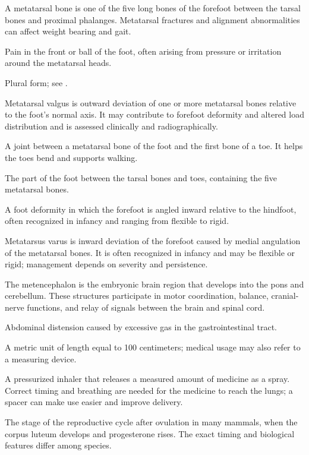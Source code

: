  A metatarsal bone is one of the five long bones of the forefoot between the tarsal bones and proximal phalanges. Metatarsal fractures and alignment abnormalities can affect weight bearing and gait.

 Pain in the front or ball of the foot, often arising from pressure or irritation around the metatarsal heads.

 Plural form; see .

 Metatarsal valgus is outward deviation of one or more metatarsal bones relative to the foot’s normal axis. It may contribute to forefoot deformity and altered load distribution and is assessed clinically and radiographically.

 A joint between a metatarsal bone of the foot and the first bone of a toe. It helps the toes bend and supports walking.

 The part of the foot between the tarsal bones and toes, containing the five metatarsal bones.

 A foot deformity in which the forefoot is angled inward relative to the hindfoot, often recognized in infancy and ranging from flexible to rigid.

 Metatarsus varus is inward deviation of the forefoot caused by medial angulation of the metatarsal bones. It is often recognized in infancy and may be flexible or rigid; management depends on severity and persistence.

 The metencephalon is the embryonic brain region that develops into the pons and cerebellum. These structures participate in motor coordination, balance, cranial-nerve functions, and relay of signals between the brain and spinal cord.

 Abdominal distension caused by excessive gas in the gastrointestinal tract.

 A metric unit of length equal to 100 centimeters; medical usage may also refer to a measuring device.

 A pressurized inhaler that releases a measured amount of medicine as a spray. Correct timing and breathing are needed for the medicine to reach the lungs; a spacer can make use easier and improve delivery.

 The stage of the reproductive cycle after ovulation in many mammals, when the corpus luteum develops and progesterone rises. The exact timing and biological features differ among species.

